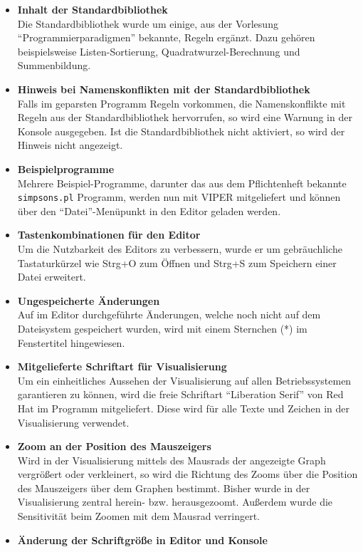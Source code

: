 \documentclass[parskip=full,11pt,twoside]{scrartcl}
\begin{document}
\begin{itemize}
  \item \textbf{Inhalt der Standardbibliothek}\\
        Die Standardbibliothek wurde um einige, aus der Vorlesung \enquote{Programmierparadigmen} bekannte, Regeln ergänzt. Dazu gehören beispielsweise Listen-Sortierung, Quadratwurzel-Berechnung und Summenbildung.
  \item \textbf{Hinweis bei Namenskonflikten mit der Standardbibliothek}\\
        Falls im geparsten Programm Regeln vorkommen, die Namenskonflikte mit Regeln aus der Standardbibliothek hervorrufen, so wird eine Warnung in der Konsole ausgegeben. Ist die Standardbibliothek nicht aktiviert, so wird der Hinweis nicht angezeigt.
  \item \textbf{Beispielprogramme}\\
        Mehrere Beispiel-Programme, darunter das aus dem Pflichtenheft bekannte \texttt{simpsons.pl} Programm, werden nun mit VIPER mitgeliefert und können über den \enquote{Datei}-Menüpunkt in den Editor geladen werden.
  \item \textbf{Tastenkombinationen für den Editor}\\
        Um die Nutzbarkeit des Editors zu verbessern, wurde er um gebräuchliche Tastaturkürzel wie Strg+O zum Öffnen und Strg+S zum Speichern einer Datei erweitert.
  \item \textbf{Ungespeicherte Änderungen}\\
        Auf im Editor durchgeführte Änderungen, welche noch nicht auf dem Dateisystem gespeichert wurden, wird mit einem Sternchen (*) im Fenstertitel hingewiesen.
  \item \textbf{Mitgelieferte Schriftart für Visualisierung}\\
        Um ein einheitliches Aussehen der Visualisierung auf allen Betriebssystemen garantieren zu können, wird die freie Schriftart \enquote{Liberation Serif} von Red Hat im Programm mitgeliefert. Diese wird für alle Texte und Zeichen in der Visualisierung verwendet.
  \item \textbf{Zoom an der Position des Mauszeigers}\\
        Wird in der Visualisierung mittels des Mausrads der angezeigte Graph vergrößert oder verkleinert, so wird die Richtung des Zooms über die Position des Mauszeigers über dem Graphen bestimmt. Bisher wurde in der Visualisierung zentral herein- bzw. herausgezoomt. Außerdem wurde die Sensitivität beim Zoomen mit dem Mausrad verringert.
  \item \textbf{Änderung der Schriftgröße in Editor und Konsole}\\

\end{itemize}
\end{document}
